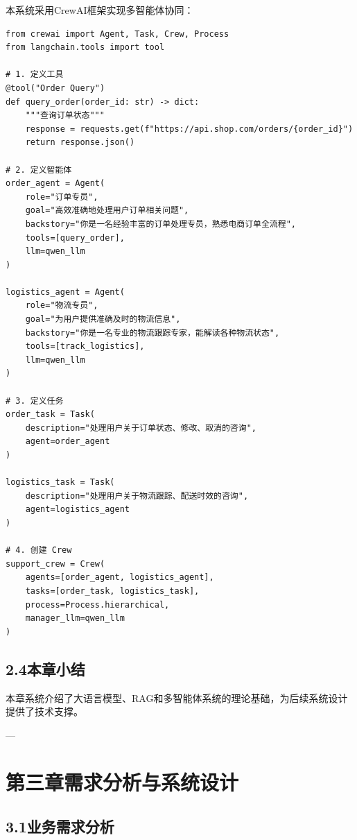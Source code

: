 \documentclass{harryopo-report}
\begin{document}
本系统采用CrewAI框架实现多智能体协同：

\begin{lstlisting}[style=pystyle,caption={}]
from crewai import Agent, Task, Crew, Process
from langchain.tools import tool

# 1. 定义工具
@tool("Order Query")
def query_order(order_id: str) -> dict:
    """查询订单状态"""
    response = requests.get(f"https://api.shop.com/orders/{order_id}")
    return response.json()

# 2. 定义智能体
order_agent = Agent(
    role="订单专员",
    goal="高效准确地处理用户订单相关问题",
    backstory="你是一名经验丰富的订单处理专员，熟悉电商订单全流程",
    tools=[query_order],
    llm=qwen_llm
)

logistics_agent = Agent(
    role="物流专员",
    goal="为用户提供准确及时的物流信息",
    backstory="你是一名专业的物流跟踪专家，能解读各种物流状态",
    tools=[track_logistics],
    llm=qwen_llm
)

# 3. 定义任务
order_task = Task(
    description="处理用户关于订单状态、修改、取消的咨询",
    agent=order_agent
)

logistics_task = Task(
    description="处理用户关于物流跟踪、配送时效的咨询",
    agent=logistics_agent
)

# 4. 创建 Crew
support_crew = Crew(
    agents=[order_agent, logistics_agent],
    tasks=[order_task, logistics_task],
    process=Process.hierarchical,
    manager_llm=qwen_llm
)
\end{lstlisting}

\section*{2.4本章小结}

本章系统介绍了大语言模型、RAG和多智能体系统的理论基础，为后续系统设计提供了技术支撑。

---

\chapter*{第三章需求分析与系统设计}

\section*{3.1业务需求分析}
\end{document}

